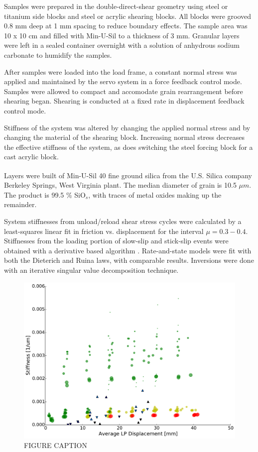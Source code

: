\documentclass[11pt]{article}
\begin{document}
Samples were prepared in the double-direct-shear geometry using steel or
titanium side blocks and steel or acrylic shearing blocks. All blocks were
grooved 0.8 mm deep at 1 mm spacing to reduce boundary effects. The sample area
was 10 x 10 cm and filled with Min-U-Sil to a thickness of 3 mm. Granular layers
were left in a sealed container overnight with a solution of anhydrous sodium
carbonate to humidify the samples.

After samples were loaded into the load frame, a constant normal stress was
applied and maintained by the servo system in a force feedback control mode.
Samples were allowed to compact and accomodate grain rearrangement before
shearing began. Shearing is conducted at a fixed rate in displacement feedback
control mode.

Stiffness of the system was altered by changing the applied normal stress and by
changing the material of the shearing block. Increasing normal stress decreases
the effective stiffness of the system, as does switching the steel forcing block
for a cast acrylic block.

Layers were built of Min-U-Sil\textsuperscript{\textregistered} 40 fine ground
silica from the U.S. Silica\textsuperscript{\textregistered} company Berkeley
Springs, West Virginia plant. The median diameter of grain is 10.5 $\mu m$. The
product is 99.5 \% SiO$_s$, with traces of metal oxides making up the remainder.

System stiffnesses from unload/reload shear stress cycles were calculated by a
least-squares linear fit in friction vs. displacement for the interval $\mu =
0.3-0.4$. Stiffnesses from the loading portion of slow-slip and stick-slip
events were obtained with a derivative based algorithm \cite{Leeman:2015}.
Rate-and-state models were fit with both the Dieterich and
Ruina laws, with comparable results. Inversions were done with an iterative
singular value decomposition technique.

\begin{figure}
	\centering
		\includegraphics[scale=0.4]{../Figures/Fig_Stiffness_Evolution/Stiffness_Evolution.pdf}
   	\caption{FIGURE CAPTION}
  	\label{Figure:Stiffness Evolution}
\end{figure}
\end{document}
